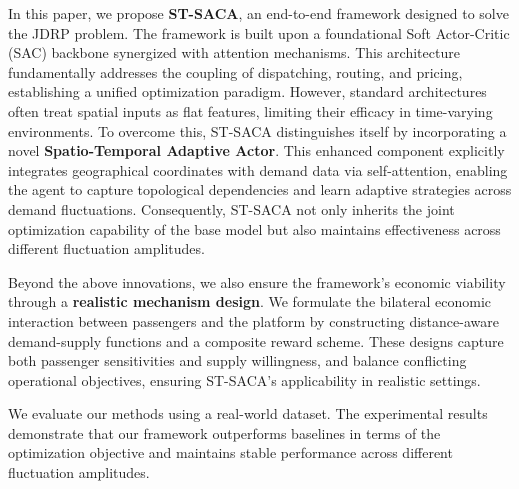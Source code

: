 \documentclass[lettersize,journal]{IEEEtran}
\begin{document}
\color{blue}
In this paper, we propose \textbf{ST-SACA}, an end-to-end framework designed to solve the JDRP problem. The framework is built upon a foundational Soft Actor-Critic (SAC) backbone synergized with attention mechanisms. This architecture fundamentally addresses the coupling of dispatching, routing, and pricing, establishing a unified optimization paradigm. However, standard architectures often treat spatial inputs as flat features, limiting their efficacy in time-varying environments. To overcome this, ST-SACA distinguishes itself by incorporating a novel \textbf{Spatio-Temporal Adaptive Actor}. This enhanced component explicitly integrates geographical coordinates with demand data via self-attention, enabling the agent to capture topological dependencies and learn adaptive strategies across demand fluctuations. Consequently, ST-SACA not only inherits the joint optimization capability of the base model but also maintains effectiveness across different fluctuation amplitudes.

Beyond the above innovations, we also ensure the framework's economic viability through a \textbf{realistic mechanism design}. We formulate the bilateral economic interaction between passengers and the platform by constructing distance-aware demand-supply functions and a composite reward scheme. These designs capture both passenger sensitivities and supply willingness, and balance conflicting operational objectives, ensuring ST-SACA's applicability in realistic settings.

\color{black}

We evaluate our methods using a real-world dataset. The experimental results demonstrate that our framework outperforms baselines in terms of the optimization objective and maintains stable performance across different fluctuation amplitudes.
\end{document}
